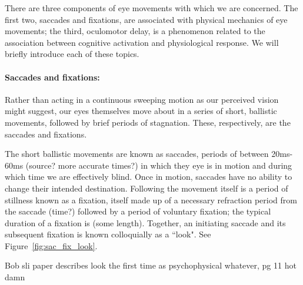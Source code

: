 \documentclass{article}
\begin{document}
There are three components of eye movements with which we are concerned. The first two, saccades and fixations, are associated with physical mechanics of eye movements; the third, oculomotor delay, is a phenomenon related to the association between cognitive activation and physiological response. We will briefly introduce each of these topics. 

\paragraph{Saccades and fixations:} Rather than acting in a continuous sweeping motion as our perceived vision might suggest, our eyes themselves move about in a series of short, ballistic movements, followed by brief periods of stagnation. These, respectively, are the saccades and fixations. 

The short ballistic movements are known as saccades, periods of between 20ms-60ms (source? more accurate times?) in which they eye is in motion and during which time we are effectively blind. Once in motion, saccades have no ability to change their intended destination. Following the movement itself is a period of stillness known as a fixation, itself made up of a necessary refraction period from the saccade (time?) followed by a period of voluntary fixation; the typical duration of a fixation is (some length). Together, an initiating saccade and its subsequent fixation is known colloquially as a ``look". See Figure~\ref{fig:sac_fix_look}.

Bob sli paper describes look the first time as psychophysical whatever, pg 11 hot damn
\end{document}
